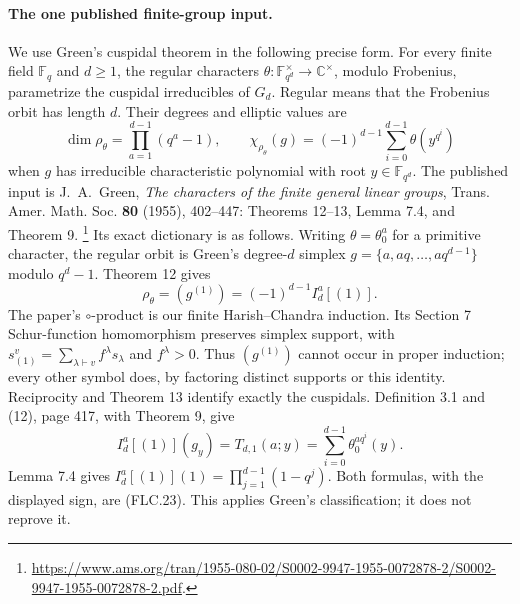\paragraph{The one published finite-group input.}
We use Green's cuspidal theorem in the following precise form.
For every finite field $\mathbb F_q$ and $d\ge1$, the regular
characters $\theta:\mathbb F_{q^d}^{\times}\to\mathbb C^\times$,
modulo Frobenius, parametrize the cuspidal irreducibles of
$G_d$.  Regular means that the Frobenius orbit has length $d$.
Their degrees and elliptic values are
\[
 \dim\rho_\theta=\prod_{a=1}^{d-1}(q^a-1),\qquad
 \chi_{\rho_\theta}(g)=(-1)^{d-1}
                     \sum_{i=0}^{d-1}\theta(y^{q^i})
 \tag{FLC.23}
\]
when $g$ has irreducible characteristic polynomial with root
$y\in\mathbb F_{q^d}$.
The published input is
J.~A.~Green, \emph{The characters of the finite general linear
groups}, Trans. Amer. Math. Soc. \textbf{80} (1955), 402--447:
Theorems 12--13, Lemma 7.4, and Theorem 9.
\footnote{\url{https://www.ams.org/tran/1955-080-02/S0002-9947-1955-0072878-2/S0002-9947-1955-0072878-2.pdf}.}
Its exact dictionary is as follows.  Writing $\theta=\theta_0^a$
for a primitive character, the regular orbit is Green's
degree-$d$ simplex $g=\{a,aq,\ldots,aq^{d-1}\}$ modulo $q^d-1$.
Theorem 12 gives
\[
 \rho_\theta=(g^{(1)})=(-1)^{d-1}I_d^a[(1)].
\]
The paper's $\circ$-product is our finite Harish--Chandra induction.
Its Section 7 Schur-function homomorphism preserves simplex
support, with $s_{(1)}^v=\sum_{\lambda\vdash v}f^\lambda s_\lambda$
and $f^\lambda>0$.  Thus $(g^{(1)})$ cannot occur in proper
induction; every other symbol does, by factoring distinct
supports or this identity.  Reciprocity and Theorem 13 identify
exactly the cuspidals.  Definition 3.1 and (12), page 417,
with Theorem 9, give
\[
 I_d^a[(1)](g_y)=T_{d,1}(a;y)
                    =\sum_{i=0}^{d-1}\theta_0^{a q^i}(y).
\]
Lemma 7.4 gives
$I_d^a[(1)](1)=\prod_{j=1}^{d-1}(1-q^j)$.
Both formulas, with the displayed sign, are (FLC.23).
This applies Green's classification; it does not reprove it.

